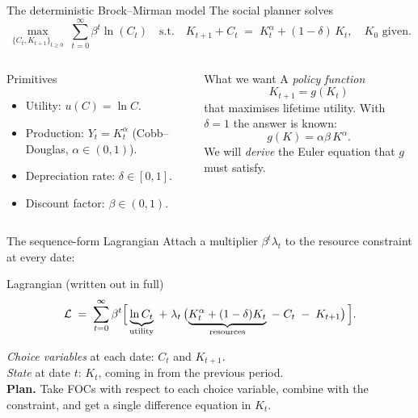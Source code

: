 \documentclass[aspectratio=169,11pt]{beamer}
\begin{document}
\begin{frame}[shrink=10]{The deterministic Brock--Mirman model}
\small The social planner solves
\[
\max_{\{C_t, K_{t+1}\}_{t \ge 0}} \;\sum_{t=0}^{\infty} \beta^t \ln(C_t)
\quad\text{s.t.}\quad
K_{t+1} + C_t \;=\; K_t^{\alpha} + (1-\delta)\,K_t, \quad K_0\text{ given}.
\]
\vspace{-6pt}
\begin{columns}[t]
\begin{block}{Primitives}
\small
\begin{itemize}\itemsep2pt
\item Utility: $u(C) = \ln C$.
\item Production: $Y_t = K_t^\alpha$ (Cobb--Douglas, $\alpha \in (0,1)$).
\item Depreciation rate: $\delta \in [0,1]$.
\item Discount factor: $\beta \in (0,1)$.
\end{itemize}
\end{block}
\begin{block}{What we want}
\small
A \emph{policy function}
\[
K_{t+1} = g(K_t)
\]
that maximises lifetime utility. With $\delta = 1$ the answer is known:
\[
g(K) = \alpha\beta\, K^\alpha.
\]
We will \emph{derive} the Euler equation that $g$ must satisfy.
\end{block}
\end{columns}
\end{frame}

\begin{frame}{The sequence-form Lagrangian}
\small Attach a multiplier $\beta^t \lambda_t$ to the resource constraint at every date:
\begin{block}{Lagrangian (written out in full)}
\small
\[
\mathcal{L} \;=\; \sum_{t=0}^{\infty} \beta^t \Bigl[\, \underbrace{\ln C_t}_{\text{utility}} \;+\; \lambda_t\,\bigl(\underbrace{K_t^\alpha + (1-\delta)K_t}_{\text{resources}} \;-\; C_t \;-\; K_{t+1}\bigr)\,\Bigr].
\]
\end{block}
\vspace{2pt}
\emph{Choice variables} at each date: $C_t$ and $K_{t+1}$.\\
\emph{State} at date $t$: $K_t$, coming in from the previous period.\\[6pt]
\textbf{Plan.} Take FOCs with respect to each choice variable, combine with the constraint, and get a single difference equation in $K_t$.
\end{frame}
\end{document}

